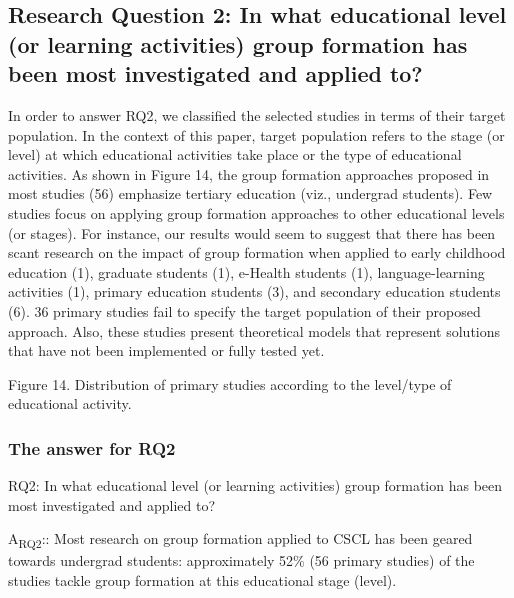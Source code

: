 \subsection{Research Question 2: In what educational level (or learning activities) group formation has been most investigated and applied to?}

In order to answer RQ2, we classified the selected studies in terms of their target population. In the context of this paper, target population refers to the stage (or level) at which educational activities take place or the type of educational activities. As shown in Figure 14, the group formation approaches proposed in most studies (56) emphasize tertiary education (viz., undergrad students). Few studies focus on applying group formation approaches to other educational levels (or stages). For instance, our results would seem to suggest that there has been scant research on the impact of group formation when applied to early childhood education (1), graduate students (1), e-Health students (1), language-learning activities (1), primary education students (3), and secondary education students (6). 36 primary studies fail to specify the target population of their proposed approach. Also, these studies present theoretical models that represent solutions that have not been implemented or fully tested yet.
 
Figure 14. Distribution of primary studies according to the level/type of educational activity.

\subsubsection{The answer for RQ2}

RQ2: In what educational level (or learning activities) group formation has been most investigated and applied to?

A\textsubscript{RQ2}:: Most research on group formation applied to CSCL has been geared towards undergrad students: approximately 52\% (56 primary studies) of the studies tackle group formation at this educational stage (level). 


